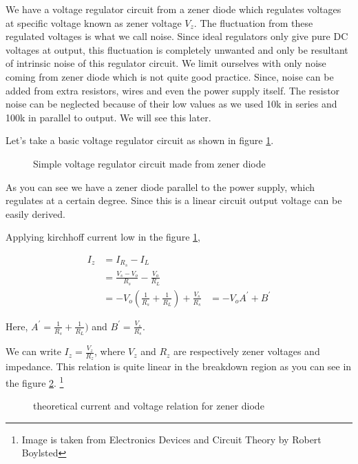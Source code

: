 \documentclass[final,5p,12pt,twocolumn]{elsaarticle}
\begin{document}
We have a voltage regulator circuit from a zener diode which regulates voltages at specific voltage known as zener voltage $V_{z}$. The fluctuation from these regulated voltages is what we call noise. Since ideal regulators only give pure DC voltages at output, this fluctuation is completely unwanted and only be resultant of intrinsic noise of this regulator circuit.  We limit ourselves with only noise coming from zener diode which is not quite good practice. Since, noise can be added from extra resistors, wires and even the power supply itself. The resistor noise can be neglected because of their low values as we used 10k in series and 100k in parallel to output. We will see this later.

Let’s take a basic voltage regulator circuit as shown in figure \ref{thcir1}.

\begin{figure}[hbt!]
\caption{Simple voltage regulator circuit made from zener diode \label{thcir1}}
\end{figure}

As you can see we have a zener diode parallel to the power supply, which regulates at a certain degree. Since this is a linear circuit output voltage can be easily derived.

Applying kirchhoff current low in the figure \ref{thcir1},


\begin{align*}
I_{z} & = I_{R_s} -I_{L}\\
& = \frac{V_s-V_o}{R_s}-\frac{V_o}{R_L}\\
& = -V_o(\frac{1}{R_s}+\frac{1}{R_L})+ \frac{V_s}{R_s}
& = -V_oA^{\prime}+B^{\prime}
\end{align*}

Here, $A^{\prime} = \frac{1}{R_s}+\frac{1}{R_L})$ and $B^{\prime} = \frac{V_s}{R_s}
$.  

We can write $I_z = \frac{V_z}{R_z}$, where $V_z$ and $R_z$ are respectively zener voltages and impedance.  This relation is quite linear in the breakdown region as you can see in the figure \ref{thiv}. \footnote{Image is taken from Electronics Devices and Circuit Theory by Robert Boylsted}

\begin{figure}[hbt!]
\caption{theoretical current and voltage relation for zener diode \label{thiv}}
\end{figure}
\end{document}
